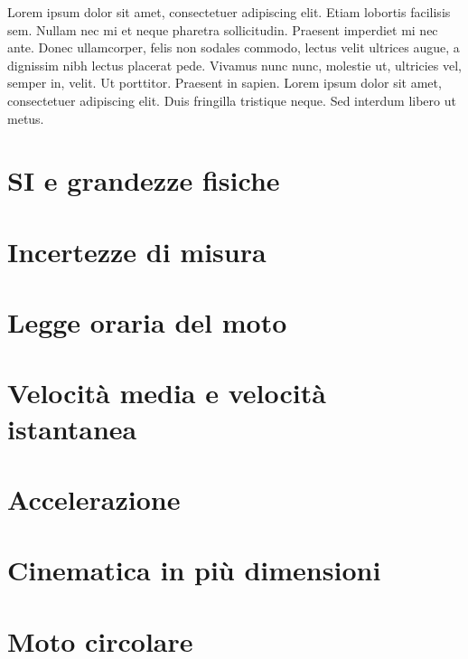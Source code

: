 \documentclass{book}
\begin{document}
Lorem ipsum dolor sit amet, consectetuer adipiscing elit. Etiam lobortis facilisis
sem. Nullam nec mi et neque pharetra sollicitudin. Praesent imperdiet mi nec
ante. Donec ullamcorper, felis non sodales commodo, lectus velit ultrices augue,
a dignissim nibh lectus placerat pede. Vivamus nunc nunc, molestie ut, ultricies
vel, semper in, velit. Ut porttitor. Praesent in sapien. Lorem ipsum dolor sit
amet, consectetuer adipiscing elit. Duis fringilla tristique neque. Sed interdum
libero ut metus. 

\section{SI e grandezze fisiche}
\section{Incertezze di misura}



\section{Legge oraria del moto}
\section{Velocità media e velocità istantanea}
\section{Accelerazione}

\section{Cinematica in più dimensioni}
\section{Moto circolare}









\end{document}
